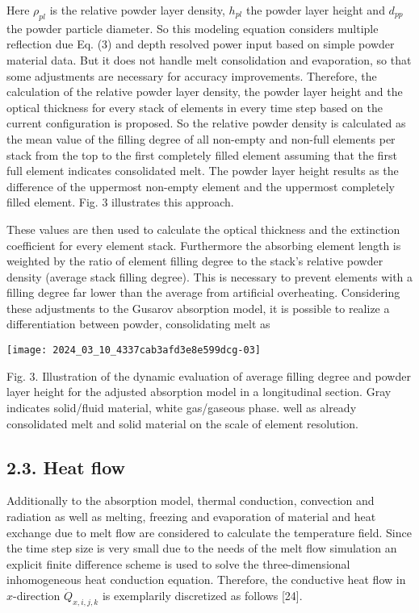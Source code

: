 \documentclass[10pt]{article}
\begin{document}
Here $\rho_{p l}$ is the relative powder layer density, $h_{p l}$ the powder layer height and $d_{p p}$ the powder particle diameter. So this modeling equation considers multiple reflection due Eq. (3) and depth resolved power input based on simple powder material data. But it does not handle melt consolidation and evaporation, so that some adjustments are necessary for accuracy improvements. Therefore, the calculation of the relative powder layer density, the powder layer height and the optical thickness for every stack of elements in every time step based on the current configuration is proposed. So the relative powder density is calculated as the mean value of the filling degree of all non-empty and non-full elements per stack from the top to the first completely filled element assuming that the first full element indicates consolidated melt. The powder layer height results as the difference of the uppermost non-empty element and the uppermost completely filled element. Fig. 3 illustrates this approach.

These values are then used to calculate the optical thickness and the extinction coefficient for every element stack. Furthermore the absorbing element length is weighted by the ratio of element filling degree to the stack's relative powder density (average stack filling degree). This is necessary to prevent elements with a filling degree far lower than the average from artificial overheating. Considering these adjustments to the Gusarov absorption model, it is possible to realize a differentiation between powder, consolidating melt as

\begin{center}
\texttt{[image: 2024\_03\_10\_4337cab3afd3e8e599dcg-03]}
\end{center}

Fig. 3. Illustration of the dynamic evaluation of average filling degree and powder layer height for the adjusted absorption model in a longitudinal section. Gray indicates solid/fluid material, white gas/gaseous phase. well as already consolidated melt and solid material on the scale of element resolution.

\subsection*{2.3. Heat flow}
Additionally to the absorption model, thermal conduction, convection and radiation as well as melting, freezing and evaporation of material and heat exchange due to melt flow are considered to calculate the temperature field. Since the time step size is very small due to the needs of the melt flow simulation an explicit finite difference scheme is used to solve the three-dimensional inhomogeneous heat conduction equation. Therefore, the conductive heat flow in $x$-direction $\dot{Q}_{x, i, j, k}$ is exemplarily discretized as follows [24].
\end{document}
